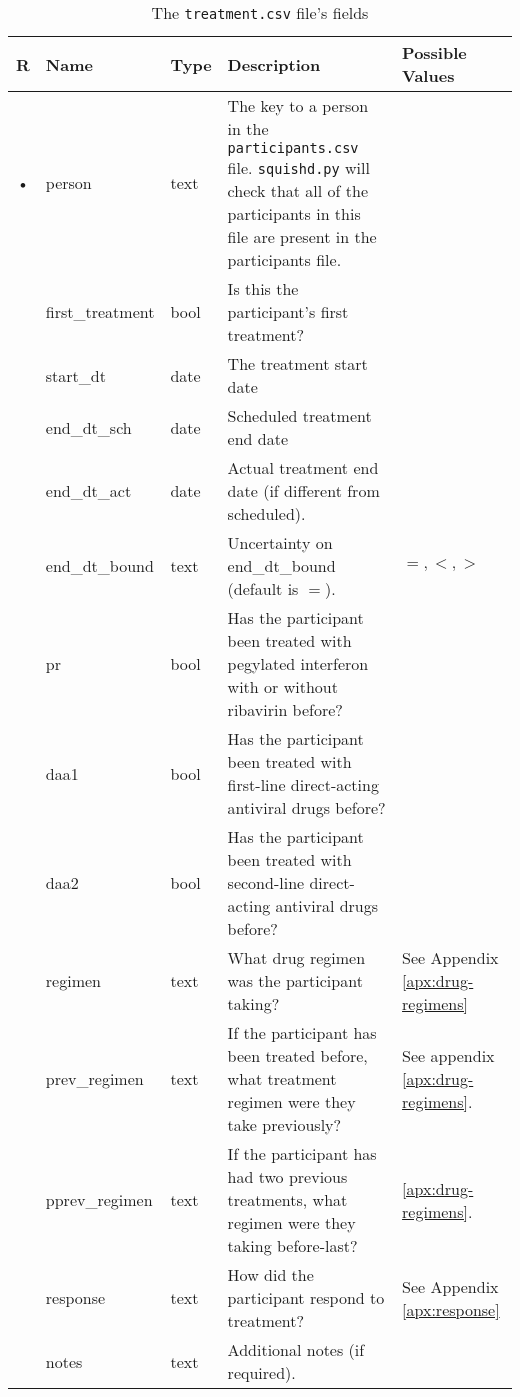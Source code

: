 \documentclass{article}
\begin{document}
\begin{table}
  \centering
  \caption{The \texttt{treatment.csv} file's fields}
  \label{tbl:treatment.csv}
  \begin{tabular}{cllp{6cm}p{4cm}}
    R & Name                & Type      & Description   & Possible Values\\ \hline
    • & person              & text    & The key to a person in the \texttt{participants.csv}
    file. \texttt{squishd.py} will check that all of the participants in this file
    are present in the participants file. & \\
      & first\_treatment    & bool      & Is this the participant's first treatment? & \\
      & start\_dt           & date      & The treatment start date & \\
      & end\_dt\_sch        & date      & Scheduled treatment end date & \\
      & end\_dt\_act        & date      & Actual treatment end date (if different from scheduled). \\
      & end\_dt\_bound      & text    &
    Uncertainty on end\_dt\_bound (default is $=$). & $=, <, >$ \\
      & pr                  & bool      & Has the participant been treated with pegylated interferon with or without ribavirin before? & \\
      & daa1                & bool      & Has the participant been treated with first-line direct-acting antiviral drugs before? & \\
      & daa2                & bool      & Has the participant been treated with second-line direct-acting antiviral drugs before? & \\
      & regimen             & text      & What drug regimen was the participant taking? & See Appendix \ref{apx:drug-regimens} \\
      & prev\_regimen       & text      & If the participant has been treated before, what treatment regimen were they take previously?  & See appendix \ref{apx:drug-regimens}. \\
      & pprev\_regimen      & text      & If the participant has had two previous treatments, what regimen were they taking before-last? & \ref{apx:drug-regimens}. \\
      & response            & text      & How did the participant respond to treatment? & See Appendix \ref{apx:response} \\
      & notes               & text    & Additional notes (if required). & \\
  \end{tabular}
\end{table}
\end{document}
